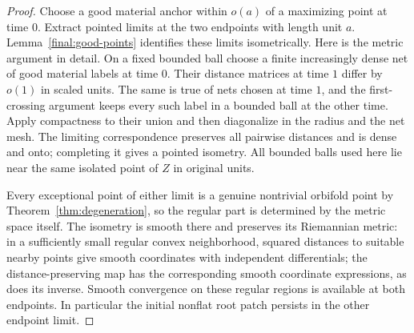 \begin{proof}
Choose a good material anchor within $o(a)$ of a maximizing point
at time $0$.  Extract pointed limits at the two endpoints with
length unit $a$.  Lemma~\ref{final:good-points} identifies these
limits isometrically.  Here is the metric argument in detail.
On a fixed bounded ball choose a finite increasingly dense net of
good material labels at time $0$.  Their distance matrices at time
$1$ differ by $o(1)$ in scaled units.  The same is true of nets
chosen at time $1$, and the first-crossing argument keeps every
such label in a bounded ball at the other time.  Apply compactness
to their union and then diagonalize in the radius and the net
mesh.  The limiting correspondence preserves all pairwise
distances and is dense and onto; completing it gives a pointed
isometry.  All bounded balls used here lie near the same isolated
point of $Z$ in original units.

Every exceptional point of either limit is a genuine nontrivial
orbifold point by Theorem~\ref{thm:degeneration}, so the regular
part is determined by the metric space itself.  The isometry is
smooth there and preserves its Riemannian metric: in a sufficiently
small regular convex neighborhood, squared distances to suitable
nearby points give smooth coordinates with independent differentials;
the distance-preserving map has the corresponding smooth coordinate
expressions, as does its inverse.  Smooth convergence on these
regular regions is available at both endpoints.  In particular the
initial nonflat root patch persists in the other endpoint limit.


\end{proof}
